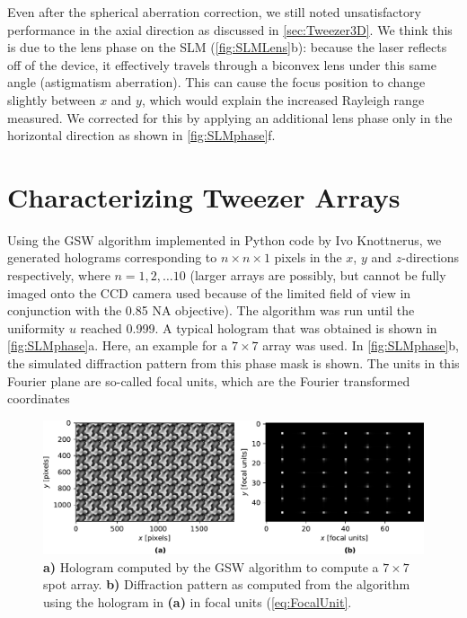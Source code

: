 Even after the spherical aberration correction, we still noted unsatisfactory performance in the axial direction as discussed in \cref{sec:Tweezer3D}. 
We think this is due to the lens phase on the SLM (\cref{fig:SLMLens}b): because the laser reflects off of the device, it effectively travels through a biconvex lens under this same angle (astigmatism aberration). 
This can cause the focus position to change slightly between $x$ and $y$, which would explain the increased Rayleigh range measured. 
We corrected for this by applying an additional lens phase only in the horizontal direction as shown in \cref{fig:SLMphase}f.


\section{Characterizing Tweezer Arrays}\label{sec:ArraysResults}

Using the \ac{GSW} algorithm implemented in Python code by Ivo Knottnerus, we generated holograms corresponding to $n \times n \times 1$ pixels in the $x$, $y$ and $z$-directions respectively, where $n = 1,2,\ldots 10$ (larger arrays are possibly, but cannot be fully imaged onto the CCD camera used because of the limited field of view in conjunction with the 0.85 NA objective). 
The algorithm was run until the uniformity $u$ reached 0.999. 
A typical hologram that was obtained is shown in \cref{fig:SLMphase}a.
Here, an example for a $7 \times 7$ array was used. 
In \cref{fig:SLMphase}b, the simulated diffraction pattern from this phase mask is shown. 
The units in this Fourier plane are so-called focal units, which are the Fourier transformed coordinates \cite{Bijnen2015}



\begin{figure}
    \centering
    \includegraphics[width=\textwidth]{figures/MaskAndComputedPattern.pdf}
    \caption{\textsf{\textbf{a)}} Hologram computed by the \ac{GSW} algorithm to compute a $7\times7$ spot array.
    \textsf{\textbf{b)}} Diffraction pattern as computed from the algorithm using the hologram in \textsf{\textbf{(a)}} in focal units (\cref{eq:FocalUnit}.}
    \label{fig:HologramPattern}
\end{figure}

